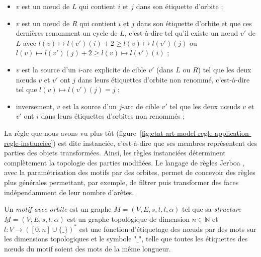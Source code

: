 \begin{theoreme}
\begin{itemize}
		      \begin{itemize}
			      \item $v$ est un n\oe ud de $L$ qui contient $i$ et $j$ dans son
			            étiquette d'orbite ;
			      \item $v$ est un n\oe ud de $R$ qui contient $i$ et $j$ dans son
			            étiquette d'orbite et que ces dernières renomment un cycle
			            de $L$, c'est-à-dire tel qu'il existe un n\oe ud $v'$ de $L$
			            avec $l(v) \mapsto l(v') (i) +2 \geq l(v) \mapsto l(v') (j)$ ou
			            $l(v) \mapsto l(v') (j) +2 \geq l(v) \mapsto l(v') (i)$ ;
			      \item $v$ est la source d'un $i$-arc explicite de cible $v'$ (dans $L$ ou
			            $R$) tel que les deux n\oe uds $v$ et $v'$ ont $j$ dans leurs
			            étiquettes d'orbite non renommé, c'est-à-dire tel que
			            $l(v) \mapsto l(v') (j) = j$ ;
			      \item inversement, $v$ est la source d'un $j$-arc de cible $v'$
			            tel que les deux n\oe uds $v$ et $v'$ ont $i$ dans leurs
			            étiquettes d'orbites non renommés ;
		      \end{itemize}
	\end{itemize}
\end{theoreme}

La règle que nous avons vu plus tôt
(figure~\ref{fig:etat-art-model-regle-application-regle-instanciee}) est dite
instanciée, c'est-à-dire que ses membres représentent des parties des objets
transformées.
Ainsi, les règles instanciées déterminent complètement la topologie des parties
modifiées. %
Le langage de règles Jerboa \cite{belhaouari2014jerboa}, avec la paramétrisation
des motifs par des orbites, permet de concevoir des règles plus générales
permettant, par exemple, de filtrer puis transformer des faces indépendamment de
leur nombre d'arêtes. %

\begin{definition}\label{def:motif-avec-orbite}%
	Un \emph{motif avec orbite} est un graphe $M=(V,E,s,t,l,\alpha)$ tel que sa \emph{structure} $\underline{M} = (V,E,s,t,\alpha)$ est un graphe topologique  de dimension $n \in \mathbb{N}$ et
	$l : V \rightarrow ([0,n] \cup \{ \_ \})^*$ est une
	fonction d'étiquetage des n\oe uds par des mots sur les dimensions topologiques
	et le symbole "$\_$", telle que toutes les étiquettes des n\oe uds du motif
	soient des mots de la même longueur.
\end{definition}

